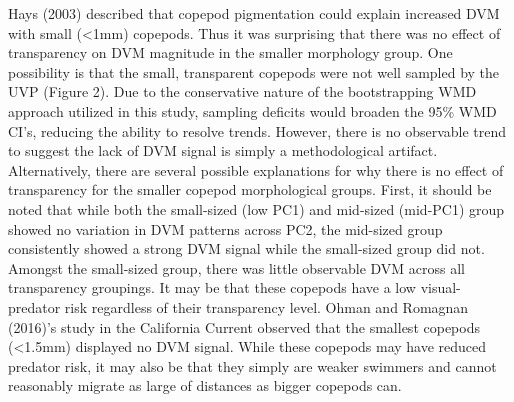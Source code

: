 \documentclass[
]{article}
\begin{document}
Hays (2003) described that copepod pigmentation could explain increased
DVM with small (\textless1mm) copepods. Thus it was surprising that
there was no effect of transparency on DVM magnitude in the smaller
morphology group. One possibility is that the small, transparent
copepods were not well sampled by the UVP (Figure 2). Due to the
conservative nature of the bootstrapping WMD approach utilized in this
study, sampling deficits would broaden the 95\% WMD CI's, reducing the
ability to resolve trends. However, there is no observable trend to
suggest the lack of DVM signal is simply a methodological artifact.
Alternatively, there are several possible explanations for why there is
no effect of transparency for the smaller copepod morphological groups.
First, it should be noted that while both the small-sized (low PC1) and
mid-sized (mid-PC1) group showed no variation in DVM patterns across
PC2, the mid-sized group consistently showed a strong DVM signal while
the small-sized group did not. Amongst the small-sized group, there was
little observable DVM across all transparency groupings. It may be that
these copepods have a low visual-predator risk regardless of their
transparency level. Ohman and Romagnan (2016)'s study in the California
Current observed that the smallest copepods (\textless1.5mm) displayed
no DVM signal. While these copepods may have reduced predator risk, it
may also be that they simply are weaker swimmers and cannot reasonably
migrate as large of distances as bigger copepods can.
\end{document}
